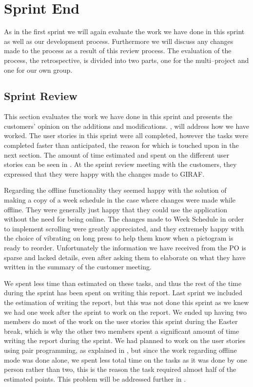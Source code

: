 \chapter{Sprint End}
As in the first sprint we will again evaluate the work we have done in this sprint as well as our development process.
Furthermore we will discuss any changes made to the process as a result of this review process.
The evaluation of the process, the retrospective, is divided into two parts, one for the multi--project and one for our own group.

\section{Sprint Review}
This section evaluates the work we have done in this sprint and presents the customers' opinion on the additions and modifications.
, will address how we have worked.
The user stories in this sprint were all completed, however the tasks were completed faster than anticipated, the reason for which is touched upon in the next section.
The amount of time estimated and spent on the different user stories can be seen in .
At the sprint review meeting with the customers, they expressed that they were happy with the changes made to GIRAF.

Regarding the offline functionality they seemed happy with the solution of making a copy of a week schedule in the case where changes were made while offline.
They were generally just happy that they could use the application without the need for being online.
The changes made to Week Schedule in order to implement scrolling were greatly appreciated, and they extremely happy with the choice of vibrating on long press to help them know when a pictogram is ready to reorder.
Unfortunately the information we have received from the PO is sparse and lacked details, even after asking them to elaborate on what they have written in the summary of the customer meeting.

We spent less time than estimated on these tasks, and thus the rest of the time during the sprint has been spent on writing this report.
Last sprint we included the estimation of writing the report, but this was not done this sprint as we knew we had one week after the sprint to work on the report.
We ended up having two members do most of the work on the user stories this sprint during the Easter break, which is why the other two members spent a significant amount of time writing the report during the sprint.
We had planned to work on the user stories using pair programming, as explained in , but since the work regarding offline mode was done alone, we spent less total time on the tasks as it was done by one person rather than two, this is the reason the task required almost half of the estimated points.
This problem will be addressed further in .


